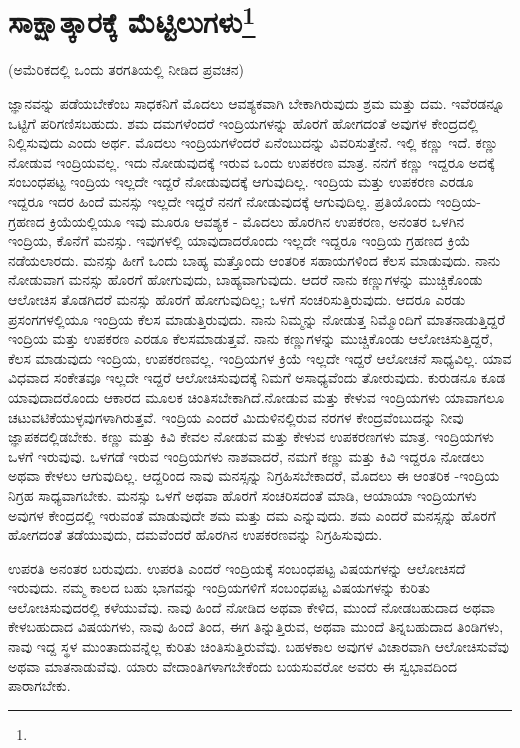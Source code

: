 
\chapter[ಸಾಕ್ಷಾತ್ಕಾರಕ್ಕೆ ಮೆಟ್ಟಿಲುಗಳು]{ಸಾಕ್ಷಾತ್ಕಾರಕ್ಕೆ ಮೆಟ್ಟಿಲುಗಳು\protect\footnote{}}

\begin{center}
(ಅಮೆರಿಕದಲ್ಲಿ ಒಂದು ತರಗತಿಯಲ್ಲಿ ನೀಡಿದ ಪ್ರವಚನ)
\end{center}

ಜ್ಞಾನವನ್ನು ಪಡೆಯಬೇಕೆಂಬ ಸಾಧಕನಿಗೆ ಮೊದಲು ಆವಶ್ಯಕವಾಗಿ ಬೇಕಾಗಿರುವುದು ಶ್ರಮ ಮತ್ತು ದಮ. ಇವೆರಡನ್ನೂ ಒಟ್ಟಿಗೆ ಪರಿಗಣಿಸಬಹುದು. ಶಮ ದಮಗಳೆಂದರೆ ಇಂದ್ರಿಯಗಳನ್ನು ಹೊರಗೆ ಹೋಗದಂತೆ ಅವುಗಳ ಕೇಂದ್ರದಲ್ಲಿ ನಿಲ್ಲಿಸುವುದು ಎಂದು ಅರ್ಥ. ಮೊದಲು ಇಂದ್ರಿಯಗಳೆಂದರೆ ಏನೆಂಬುದನ್ನು ವಿವರಿಸುತ್ತೇನೆ. ಇಲ್ಲಿ ಕಣ್ಣು ಇದೆ. ಕಣ್ಣು ನೋಡುವ ಇಂದ್ರಿಯವಲ್ಲ. ಇದು ನೋಡುವುದಕ್ಕೆ ಇರುವ ಒಂದು ಉಪಕರಣ ಮಾತ್ರ. ನನಗೆ ಕಣ್ಣು ಇದ್ದರೂ ಅದಕ್ಕೆ ಸಂಬಂಧಪಟ್ಟ ಇಂದ್ರಿಯ ಇಲ್ಲದೇ ಇದ್ದರೆ ನೋಡುವುದಕ್ಕೆ ಆಗುವುದಿಲ್ಲ. ಇಂದ್ರಿಯ ಮತ್ತು ಉಪಕರಣ ಎರಡೂ ಇದ್ದರೂ ಇದರ ಹಿಂದೆ ಮನಸ್ಸು ಇಲ್ಲದೇ ಇದ್ದರೆ ನನಗೆ ನೋಡುವುದಕ್ಕೆ ಆಗುವುದಿಲ್ಲ. ಪ್ರತಿಯೊಂದು ಇಂದ್ರಿಯ-ಗ್ರಹಣದ ಕ್ರಿಯೆಯಲ್ಲಿಯೂ ಇವು ಮೂರೂ ಆವಶ್ಯಕ - ಮೊದಲು ಹೊರಗಿನ ಉಪಕರಣ, ಅನಂತರ ಒಳಗಿನ ಇಂದ್ರಿಯ, ಕೊನೆಗೆ ಮನಸ್ಸು. ಇವುಗಳಲ್ಲಿ ಯಾವುದಾದರೊಂದು ಇಲ್ಲದೇ ಇದ್ದರೂ ಇಂದ್ರಿಯ ಗ್ರಹಣದ ಕ್ರಿಯೆ ನಡೆಯಲಾರದು. ಮನಸ್ಸು ಹೀಗೆ ಒಂದು ಬಾಹ್ಯ ಮತ್ತೊಂದು ಆಂತರಿಕ ಸಹಾಯಗಳಿಂದ ಕೆಲಸ ಮಾಡುವುದು. ನಾನು ನೋಡುವಾಗ ಮನಸ್ಸು ಹೊರಗೆ ಹೋಗುವುದು, ಬಾಹ್ಯವಾಗುವುದು. ಆದರೆ ನಾನು ಕಣ್ಣುಗಳನ್ನು ಮುಚ್ಚಿಕೊಂಡು ಆಲೋಚಿಸ ತೊಡಗಿದರೆ ಮನಸ್ಸು ಹೊರಗೆ ಹೋಗುವುದಿಲ್ಲ; ಒಳಗೆ ಸಂಚರಿಸುತ್ತಿರುವುದು. ಆದರೂ ಎರಡು ಪ್ರಸಂಗಗಳಲ್ಲಿಯೂ ಇಂದ್ರಿಯ ಕೆಲಸ ಮಾಡುತ್ತಿರುವುದು. ನಾನು ನಿಮ್ಮನ್ನು ನೋಡುತ್ತ ನಿಮ್ಮೊಂದಿಗೆ ಮಾತನಾಡುತ್ತಿದ್ದರೆ ಇಂದ್ರಿಯ ಮತ್ತು ಉಪಕರಣ ಎರಡೂ ಕೆಲಸಮಾಡುತ್ತವೆ. ನಾನು ಕಣ್ಣುಗಳನ್ನು ಮುಚ್ಚಿಕೊಂಡು ಆಲೋಚಿಸುತ್ತಿದ್ದರೆ, ಕೆಲಸ ಮಾಡುವುದು ಇಂದ್ರಿಯ, ಉಪಕರಣವಲ್ಲ. ಇಂದ್ರಿಯಗಳ ಕ್ರಿಯೆ ಇಲ್ಲದೇ ಇದ್ದರೆ ಆಲೋಚನೆ ಸಾಧ್ಯವಿಲ್ಲ. ಯಾವ ವಿಧವಾದ ಸಂಕೇತವೂ ಇಲ್ಲದೇ ಇದ್ದರೆ ಆಲೋಚಿಸುವುದಕ್ಕೆ ನಿಮಗೆ ಅಸಾಧ್ಯವೆಂದು ತೋರುವುದು. ಕುರುಡನೂ ಕೂಡ ಯಾವುದಾದರೊಂದು ಆಕಾರದ ಮೂಲಕ ಚಿಂತಿಸಬೇಕಾಗಿದೆ.ನೋಡುವ ಮತ್ತು ಕೇಳುವ ಇಂದ್ರಿಯಗಳು ಯಾವಾಗಲೂ ಚಟುವಟಿಕೆಯುಳ್ಳವುಗಳಾಗಿರುತ್ತವೆ. ಇಂದ್ರಿಯ ಎಂದರೆ ಮಿದುಳಿನಲ್ಲಿರುವ ನರಗಳ ಕೇಂದ್ರವೆಂಬುದನ್ನು ನೀವು ಜ್ಞಾಪಕದಲ್ಲಿಡಬೇಕು. ಕಣ್ಣು ಮತ್ತು ಕಿವಿ ಕೇವಲ ನೋಡುವ ಮತ್ತು ಕೇಳುವ ಉಪಕರಣಗಳು ಮಾತ್ರ. ಇಂದ್ರಿಯಗಳು ಒಳಗೆ ಇರುವುವು. ಒಳಗಡೆ ಇರುವ ಇಂದ್ರಿಯಗಳು ನಾಶವಾದರೆ, ನಮಗೆ ಕಣ್ಣು ಮತ್ತು ಕಿವಿ ಇದ್ದರೂ ನೋಡಲು ಅಥವಾ ಕೇಳಲು ಆಗುವುದಿಲ್ಲ. ಆದ್ದರಿಂದ ನಾವು ಮನಸ್ಸನ್ನು ನಿಗ್ರಹಿಸಬೇಕಾದರೆ, ಮೊದಲು ಈ ಆಂತರಿಕ -ಇಂದ್ರಿಯ ನಿಗ್ರಹ ಸಾಧ್ಯವಾಗಬೇಕು. ಮನಸ್ಸು ಒಳಗೆ ಅಥವಾ ಹೊರಗೆ ಸಂಚರಿಸದಂತೆ ಮಾಡಿ, ಆಯಾಯಾ ಇಂದ್ರಿಯಗಳು ಅವುಗಳ ಕೇಂದ್ರದಲ್ಲಿ ಇರುವಂತೆ ಮಾಡುವುದೇ ಶಮ ಮತ್ತು ದಮ ಎನ್ನುವುದು. ಶಮ ಎಂದರೆ ಮನಸ್ಸನ್ನು ಹೊರಗೆ ಹೋಗದಂತೆ ತಡೆಯುವುದು, ದಮವೆಂದರೆ ಹೊರಗಿನ ಉಪಕರಣವನ್ನು ನಿಗ್ರಹಿಸುವುದು.

ಉಪರತಿ ಅನಂತರ ಬರುವುದು. ಉಪರತಿ ಎಂದರೆ ಇಂದ್ರಿಯಕ್ಕೆ ಸಂಬಂಧಪಟ್ಟ ವಿಷಯಗಳನ್ನು ಆಲೋಚಿಸದೆ ಇರುವುದು. ನಮ್ಮ ಕಾಲದ ಬಹು ಭಾಗವನ್ನು ಇಂದ್ರಿಯಗಳಿಗೆ ಸಂಬಂಧಪಟ್ಟ ವಿಷಯಗಳನ್ನು ಕುರಿತು ಆಲೋಚಿಸುವುದರಲ್ಲಿ ಕಳೆಯುವೆವು. ನಾವು ಹಿಂದೆ ನೋಡಿದ ಅಥವಾ ಕೇಳಿದ, ಮುಂದೆ ನೋಡಬಹುದಾದ ಅಥವಾ ಕೇಳಬಹುದಾದ ವಿಷಯಗಳು, ನಾವು ಹಿಂದೆ ತಿಂದ, ಈಗ ತಿನ್ನುತ್ತಿರುವ, ಅಥವಾ ಮುಂದೆ ತಿನ್ನಬಹುದಾದ ತಿಂಡಿಗಳು, ನಾವು ಇದ್ದ ಸ್ಥಳ ಮುಂತಾದುವನ್ನೆಲ್ಲ ಕುರಿತು ಚಿಂತಿಸುತ್ತಿರುವೆವು. ಬಹಳಕಾಲ ಅವುಗಳ ವಿಚಾರವಾಗಿ ಆಲೋಚಿಸುವೆವು ಅಥವಾ ಮಾತನಾಡುವೆವು. ಯಾರು ವೇದಾಂತಿಗಳಾಗಬೇಕೆಂದು ಬಯಸುವರೋ ಅವರು ಈ ಸ್ವಭಾವದಿಂದ ಪಾರಾಗಬೇಕು.

